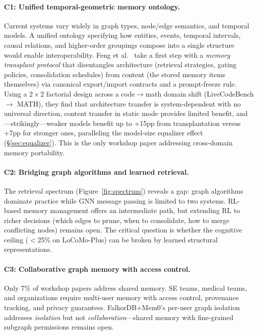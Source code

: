 \documentclass[hf]{ceurart}
\begin{document}
\paragraph{C1: Unified temporal-geometric memory ontology.}
Current systems vary widely in graph types, node/edge semantics, and
temporal models. A unified ontology specifying how entities, events,
temporal intervals, causal relations, and higher-order groupings compose
into a single structure would enable interoperability.
Feng et al.~\cite{transplants2026} take a first step with a
\emph{memory transplant protocol} that disentangles architecture
(retrieval strategies, gating policies, consolidation schedules) from
content (the stored memory items themselves) via canonical
export/import contracts and a prompt-freeze rule. Using a $2{\times}2$
factorial design across a code$\to$math domain shift (LiveCodeBench
$\to$ MATH), they find that architecture transfer is
system-dependent with no universal direction, content transfer in
static mode provides limited benefit, and---strikingly---weaker
models benefit up to +15pp from transplantation versus +7pp for
stronger ones, paralleling the model-size equalizer effect
(\S\ref{sec:equalizer}). This is the only workshop paper
addressing cross-domain memory portability.

\paragraph{C2: Bridging graph algorithms and learned retrieval.}
The retrieval spectrum (Figure~\ref{fig:spectrum}) reveals a gap:
graph algorithms dominate practice while GNN message passing is limited
to two systems. RL-based memory management offers an intermediate
path, but extending RL to richer decisions (which edges to prune, when
to consolidate, how to merge conflicting nodes) remains open. The
critical question is whether the cognitive ceiling ($<$25\% on
LoCoMo-Plus) can be broken by learned structural representations.

\paragraph{C3: Collaborative graph memory with access control.}
Only 7\% of workshop papers address shared memory. SE teams, medical
teams, and organizations require multi-user memory with access control,
provenance tracking, and privacy guarantees. FalkorDB+Mem0's per-user
graph isolation~\cite{falkordb2025} addresses \emph{isolation} but not
\emph{collaboration}---shared memory with fine-grained subgraph
permissions remains open.
\end{document}
